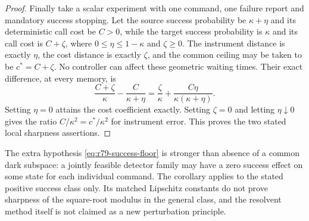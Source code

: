 \begin{proof}
Finally take a scalar experiment with one command, one failure
report and mandatory success stopping.  Let the source success
probability be $\kappa+\eta$ and its deterministic call cost be
$C>0$, while the target success probability is $\kappa$ and its
call cost is $C+\zeta$, where
$0\le\eta\le1-\kappa$ and $\zeta\ge0$.
The instrument distance is exactly $\eta$, the cost distance is
exactly $\zeta$, and the common ceiling may be taken to be
$c^*=C+\zeta$.  No controller can affect these geometric waiting
times.  Their exact difference, at every memory, is
\begin{equation}\label{eq:r79-lipschitz-local-sharpness}
 \frac{C+\zeta}{\kappa}-\frac{C}{\kappa+\eta}
       =\frac{\zeta}{\kappa}
                     +\frac{C\eta}{\kappa(\kappa+\eta)}.
\end{equation}
Setting $\eta=0$ attains the cost coefficient exactly.  Setting
$\zeta=0$ and letting $\eta\downarrow0$ gives the ratio
$C/\kappa^2=c^*/\kappa^2$ for instrument error.  This proves
the two stated local sharpness assertions.
\end{proof}

The extra hypothesis \eqref{eq:r79-success-floor} is stronger than
absence of a common dark subspace: a jointly feasible detector
family may have a zero success effect on some state for each
individual command.  The corollary applies to the stated positive
success class only.  Its matched Lipschitz constants do not prove
sharpness of the square-root modulus in the general class, and
the resolvent method itself is not claimed as a new perturbation
principle.
